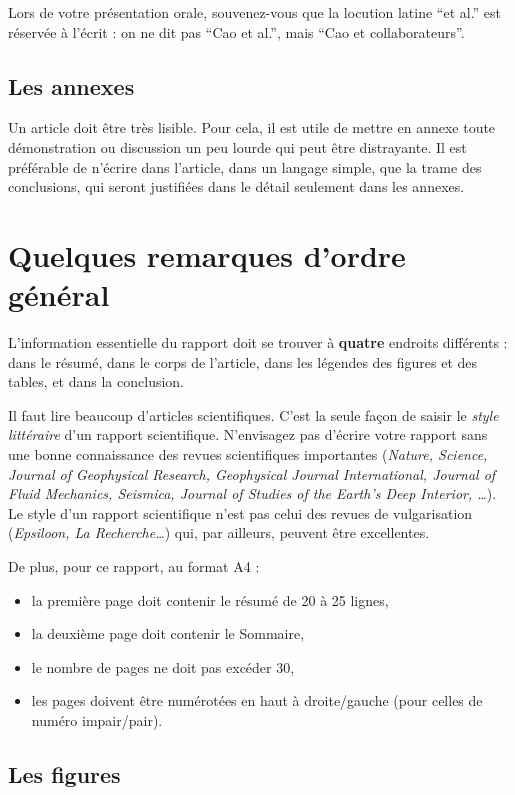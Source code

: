 \documentclass{ipgpmaster}
\begin{document}
Lors de votre présentation orale, souvenez-vous que la locution latine 
``et al.'' est réservée à l'écrit : on ne dit pas ``Cao et al.'', 
mais ``Cao et collaborateurs''.

\subsection{Les annexes}

Un article doit être très lisible. Pour cela, il est utile de mettre en 
annexe toute démonstration ou discussion un peu lourde qui peut 
être distrayante. Il est préférable de n'écrire dans l'article, 
dans un langage simple, que la trame des conclusions, qui seront justifiées 
dans le détail seulement dans les annexes.


\section{Quelques remarques d'ordre général}

L'information essentielle du rapport doit se trouver à {\bfseries quatre} endroits
différents : dans le résumé, dans le corps de l'article, dans les 
légendes des figures et des tables, et dans la conclusion.

Il faut lire beaucoup d'articles scientifiques. C'est la seule façon 
de saisir le \emph{style littéraire\/} d'un rapport scientifique.
N'envisagez pas d'écrire votre rapport sans une bonne connaissance des 
revues scientifiques importantes (\emph{Nature, Science, Journal of 
Geo\-phy\-si\-cal Research, Geophysical Journal International, 
Journal of Fluid Mechanics, Seismica, Journal of Studies of the Earth's Deep Interior, 
\dots\/}). Le style d'un rapport scientifique n'est pas celui des 
revues de vulgarisation (\emph{Epsiloon, La Recherche\dots\/})
qui, par ailleurs, peuvent être excellentes.

De plus, pour ce rapport, au format A4 :
\begin{itemize}
\item la première page doit contenir le résumé de 20 à 25 lignes, 
\item la deuxième page doit contenir le Sommaire,
\item le nombre de pages ne doit pas excéder 30,
\item les pages doivent être  numérotées en haut à droite/gauche (pour celles
de numéro impair/pair). 
\end{itemize}

\subsection{Les figures}
\end{document}
